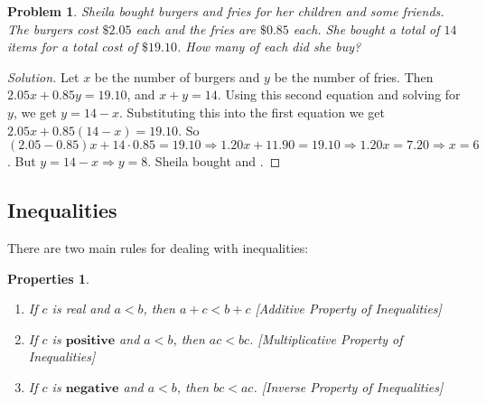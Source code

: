 \documentclass{article}
\theoremstyle{mystyle}
\newtheorem{problem}{Problem}[section]
\newtheorem{properties}{Properties}[section]
\begin{document}
\begin{problem}
Sheila bought burgers and fries for her children and some friends. The burgers cost $\$2.05$ each and the fries are $\$0.85$ each. She bought a total of $14$ items for a total cost of $\$19.10$. How many of each did she buy?
\end{problem}
\begin{proof}[Solution]
Let $x$ be the number of burgers and $y$ be the number of fries. Then $2.05x + 0.85y = 19.10$, and $x+y = 14$. Using this second equation and solving for $y$, we get $y = 14 - x$. Substituting this into the first equation we get $2.05x + 0.85(14-x) = 19.10$. So $(2.05 - 0.85)x + 14\cdot 0.85 = 19.10 \Rightarrow 1.20x + 11.90 = 19.10\Rightarrow 1.20x = 7.20 \Rightarrow \boxed{x = 6}$. But $y = 14 - x \Rightarrow \boxed{y = 8}$. Sheila bought  and .
\end{proof}
\subsection{Inequalities}
There are two main rules for dealing with inequalities:
\begin{properties}\label{property:north_shore_properties_of_inequalities}
\
\begin{enumerate}[itemsep=0pt]
    \item \label{property:north_shore_additive_property_inequals}If $c$ is real and $a<b$, then $a+c<b+c$ \hfill [Additive Property of Inequalities]
    \item \label{property:north_shore_multiplicative_property_inequals}If $c$ is $\mathbf{positive}$ and $a<b$, then $ac < bc$. \hfill [Multiplicative Property of Inequalities]
    \item \label{property:north_shore_inverse_property_inequals}If $c$ is $\mathbf{negative}$ and $a<b$, then $bc < ac$. \hfill [Inverse Property of Inequalities]
\end{enumerate}
\end{properties}
\end{document}

